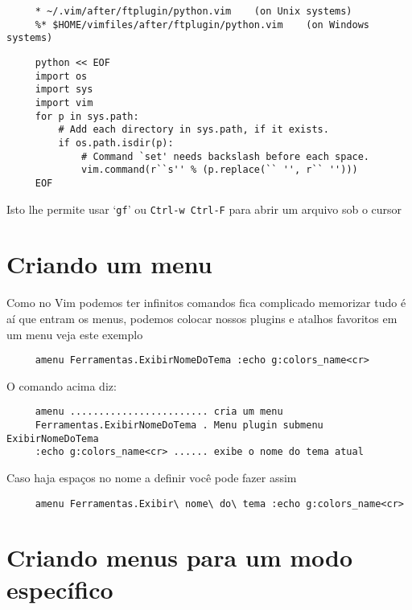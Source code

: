 \begin{verbatim}
     * ~/.vim/after/ftplugin/python.vim    (on Unix systems)
     %* $HOME/vimfiles/after/ftplugin/python.vim    (on Windows systems)
\end{verbatim}

\begin{verbatim}
     python << EOF
     import os
     import sys
     import vim
     for p in sys.path:
         # Add each directory in sys.path, if it exists.
         if os.path.isdir(p):
             # Command `set' needs backslash before each space.
             vim.command(r``s'' % (p.replace(`` '', r`` '')))
     EOF
\end{verbatim}

Isto lhe permite usar `{\tt gf}' ou {\tt Ctrl-w Ctrl-F} para abrir um arquivo sob o cursor

\section{Criando um menu}
\label{Criando um menu}

Como no Vim podemos ter infinitos comandos fica complicado memorizar tudo
é aí que entram os menus, podemos colocar nossos plugins e atalhos favoritos
em um menu veja este exemplo

\begin{verbatim}
     amenu Ferramentas.ExibirNomeDoTema :echo g:colors_name<cr>
\end{verbatim}

O comando acima diz:

\begin{verbatim}
     amenu ........................ cria um menu
     Ferramentas.ExibirNomeDoTema . Menu plugin submenu ExibirNomeDoTema
     :echo g:colors_name<cr> ...... exibe o nome do tema atual
\end{verbatim}

Caso haja espaços no nome a definir você pode fazer assim

\begin{verbatim}
     amenu Ferramentas.Exibir\ nome\ do\ tema :echo g:colors_name<cr>
\end{verbatim}

\section{Criando menus para um modo específico}
\label{Criando menus para um modo específico}

